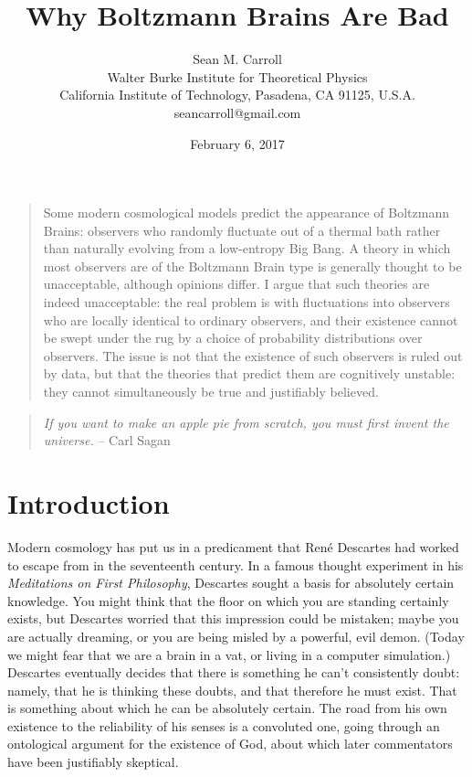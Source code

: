 \documentclass[12pt,letterpaper]{article}
\date{February 6, 2017}
\begin{document}
 

\title{Why Boltzmann Brains Are Bad}

 \author{Sean M. Carroll\\
 Walter Burke Institute for Theoretical Physics\\
 California Institute of Technology, Pasadena, CA 91125, U.S.A.\\
 seancarroll@gmail.com}
\maketitle

\begin{quotation} \noindent
Some modern cosmological models predict the appearance of Boltzmann Brains: observers who randomly fluctuate
out of a thermal bath rather than naturally evolving from a low-entropy Big Bang. 
A theory in which most observers are of the Boltzmann Brain type is generally thought to be unacceptable, although opinions differ. I argue that such theories are indeed unacceptable: the real 
problem is with fluctuations into observers who are locally identical to ordinary observers, and their existence
cannot be swept under the rug by a choice of probability distributions over observers. The issue is not
that the existence of such observers is ruled out by data, but that the theories that predict them are cognitively
unstable: they cannot simultaneously be true and justifiably believed.
\end{quotation}

\tableofcontents


\newpage

\begin{quote}
\emph{If you want to make an apple pie from scratch, you must first invent the universe.} -- Carl Sagan
\end{quote}


\section{Introduction}

Modern cosmology has put us in a predicament that Ren\'e Descartes had worked to escape from in the seventeenth century.
In a famous thought experiment in his \emph{Meditations on First Philosophy}, Descartes sought a basis for absolutely certain knowledge.
You might think that the floor on which you are standing certainly exists, but Descartes worried that this impression could be mistaken; maybe you are actually dreaming, or you are being misled by a powerful, evil demon.
(Today we might fear that we are a brain in a vat, or living in a computer simulation.)
Descartes eventually decides that there is something he can't consistently doubt: namely, that he is thinking these doubts, and that therefore he must exist.
That is something about which he can be absolutely certain.
The road from his own existence to the reliability of his senses is a convoluted one, going through an ontological argument for the existence of God, about which later commentators have been justifiably skeptical.
\end{document}
